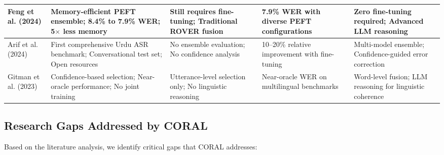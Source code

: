 \begin{table}[htbp]
\begin{tabularx}{\textwidth}{|p{2cm}|p{2.8cm}|p{2.8cm}|p{2.8cm}|p{3.3cm}|@{}}
Feng et al. (2024) & 
Memory-efficient PEFT ensemble; 8.4\% to 7.9\% WER; 5$\times$ less memory & 
Still requires fine-tuning; Traditional ROVER fusion & 
7.9\% WER with diverse PEFT configurations & 
Zero fine-tuning required; Advanced LLM reasoning \\ 
\hline

Arif et al. (2024) & 
First comprehensive Urdu ASR benchmark; Conversational test set; Open resources & 
No ensemble evaluation; No confidence analysis & 
10--20\% relative improvement with fine-tuning & 
Multi-model ensemble; Confidence-guided error correction \\ 
\hline

Gitman et al. (2023) & 
Confidence-based selection; Near-oracle performance; No joint training & 
Utterance-level selection only; No linguistic reasoning & 
Near-oracle WER on multilingual benchmarks & 
Word-level fusion; LLM reasoning for linguistic coherence \\ 
\hline
\end{tabularx}
\end{table}

\subsection{Research Gaps Addressed by CORAL}

Based on the literature analysis, we identify critical gaps that CORAL addresses:

